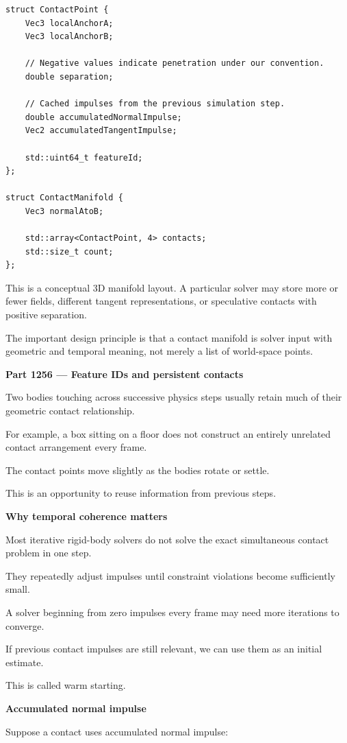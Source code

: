 \begin{verbatim}
struct ContactPoint {
    Vec3 localAnchorA;
    Vec3 localAnchorB;

    // Negative values indicate penetration under our convention.
    double separation;

    // Cached impulses from the previous simulation step.
    double accumulatedNormalImpulse;
    Vec2 accumulatedTangentImpulse;

    std::uint64_t featureId;
};

struct ContactManifold {
    Vec3 normalAtoB;

    std::array<ContactPoint, 4> contacts;
    std::size_t count;
};
\end{verbatim}

This is a conceptual 3D manifold layout. A particular solver may store more or fewer fields, different tangent representations, or speculative contacts with positive separation.

The important design principle is that a contact manifold is solver input with geometric and temporal meaning, not merely a list of world-space points.

\textbf{Part 1256 --- Feature IDs and persistent contacts}

Two bodies touching across successive physics steps usually retain much of their geometric contact relationship.

For example, a box sitting on a floor does not construct an entirely unrelated contact arrangement every frame.

The contact points move slightly as the bodies rotate or settle.

This is an opportunity to reuse information from previous steps.

\textbf{Why temporal coherence matters}

Most iterative rigid-body solvers do not solve the exact simultaneous contact problem in one step.

They repeatedly adjust impulses until constraint violations become sufficiently small.

A solver beginning from zero impulses every frame may need more iterations to converge.

If previous contact impulses are still relevant, we can use them as an initial estimate.

This is called warm starting.

\textbf{Accumulated normal impulse}

Suppose a contact uses accumulated normal impulse:

